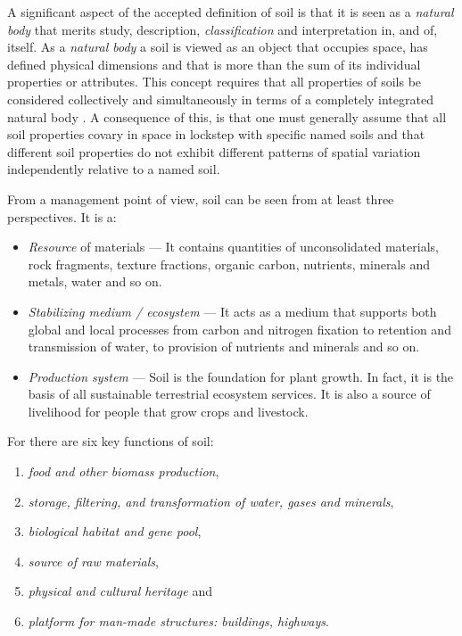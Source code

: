 \documentclass[graybox,natbib,nospthms,UStrade]{svmono}
\begin{document}
A significant aspect of the accepted definition of soil is that it is
seen as a \emph{natural body} that merits study, description,
\emph{classification} and interpretation in, and of, itself. As a \emph{natural
body} a soil is viewed as an object that occupies space, has defined
physical dimensions and that is more than the sum of its individual
properties or attributes. This concept requires that all properties of
soils be considered collectively and simultaneously in terms of a completely integrated
natural body \citep{SSDS1993}. A consequence of this, is that one must
generally assume that all soil properties covary in space in lockstep
with specific named soils and that different soil properties do not
exhibit different patterns of spatial variation independently relative
to a named soil.

From a management point of view, soil can be seen from at least three
perspectives. It is a:

\begin{itemize}
\item
  \emph{Resource} of materials --- It contains quantities of unconsolidated
  materials, rock fragments, texture fractions, organic carbon,
  nutrients, minerals and metals, water and so on.
\item
  \emph{Stabilizing medium / ecosystem} --- It acts as a medium that supports
  both global and local processes from carbon and nitrogen fixation to
  retention and transmission of water, to provision of nutrients and
  minerals and so on.
\item
  \emph{Production system} --- Soil is the foundation for plant growth. In
  fact, it is the basis of all sustainable terrestrial
  ecosystem services. It is also a source of livelihood for people
  that grow crops and livestock.
\end{itemize}

For \citet{frossard2006function} there are six key functions of soil:

\begin{enumerate}
\def\labelenumi{\arabic{enumi}.}
\item
  \emph{food and other biomass production},
\item
  \emph{storage, filtering, and transformation of water, gases and
  minerals},
\item
  \emph{biological habitat and gene pool},
\item
  \emph{source of raw materials},
\item
  \emph{physical and cultural heritage} and
\item
  \emph{platform for man-made structures: buildings, highways}.
\end{enumerate}
\end{document}
